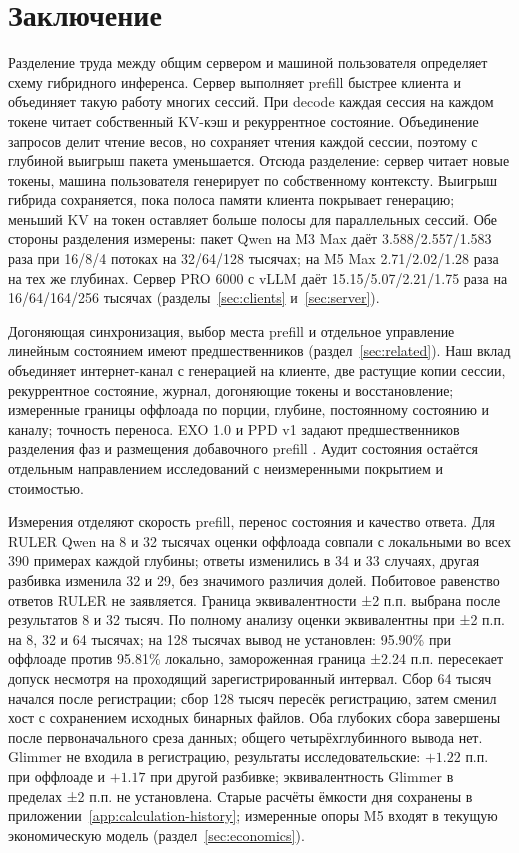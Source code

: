 \section{Заключение}
\label{sec:conclusion}

Разделение труда между общим сервером и машиной пользователя определяет схему гибридного инференса.
Сервер выполняет prefill быстрее клиента и объединяет такую работу многих сессий.
При decode каждая сессия на каждом токене читает собственный KV-кэш и рекуррентное состояние.
Объединение запросов делит чтение весов, но сохраняет чтения каждой сессии, поэтому с глубиной выигрыш пакета уменьшается.
Отсюда разделение: сервер читает новые токены, машина пользователя генерирует по собственному контексту.
Выигрыш гибрида сохраняется, пока полоса памяти клиента покрывает генерацию; меньший KV на токен оставляет больше полосы для параллельных сессий.
Обе стороны разделения измерены: пакет Qwen на M3 Max даёт 3.588/2.557/1.583 раза при 16/8/4 потоках на 32/64/128 тысячах;
на M5 Max 2.71/2.02/1.28 раза на тех же глубинах. Сервер PRO 6000 с vLLM даёт 15.15/5.07/2.21/1.75 раза
на 16/64/164/256 тысячах (разделы~\ref{sec:clients} и~\ref{sec:server}).

Догоняющая синхронизация, выбор места prefill и отдельное управление линейным состоянием имеют предшественников
(раздел~\ref{sec:related}). Наш вклад объединяет интернет-канал с генерацией на клиенте,
две растущие копии сессии, рекуррентное состояние, журнал, догоняющие токены и восстановление;
измеренные границы оффлоада по порции, глубине, постоянному состоянию и каналу; точность переноса.
EXO 1.0 и PPD v1 задают предшественников разделения фаз и размещения добавочного prefill \cite{exolabsSpark,li2026ppd}.
Аудит состояния остаётся отдельным направлением исследований с неизмеренными покрытием и стоимостью.

Измерения отделяют скорость prefill, перенос состояния и качество ответа.
Для RULER Qwen на 8 и 32 тысячах оценки оффлоада совпали с локальными во всех 390 примерах каждой глубины;
ответы изменились в 34 и 33 случаях, другая разбивка изменила 32 и 29, без значимого различия долей.
Побитовое равенство ответов RULER не заявляется. Граница эквивалентности ±2 п.п. выбрана после результатов 8 и 32 тысяч.
По полному анализу оценки эквивалентны при ±2 п.п. на 8, 32 и 64 тысячах; на 128 тысячах вывод
не установлен: 95.90\% при оффлоаде против 95.81\% локально, замороженная граница ±2.24 п.п.
пересекает допуск несмотря на проходящий зарегистрированный интервал. Сбор 64 тысяч начался после регистрации;
сбор 128 тысяч пересёк регистрацию, затем сменил хост с сохранением исходных бинарных файлов.
Оба глубоких сбора завершены после первоначального среза данных; общего четырёхглубинного вывода нет. Glimmer не входила в регистрацию,
результаты исследовательские: $+1.22$ п.п. при оффлоаде и $+1.17$ при другой разбивке;
эквивалентность Glimmer в пределах ±2 п.п. не установлена.
Старые расчёты ёмкости дня сохранены в приложении~\ref{app:calculation-history}; измеренные опоры M5 входят в текущую экономическую модель (раздел~\ref{sec:economics}).


